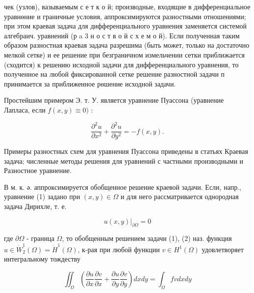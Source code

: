 \documentclass[10pt]{article}
\begin{document}
чек (узлов), вазываемым с е т к о й; производные, входящие в дифференциальное уравнөние и граничные условия, аппроксимируются разностными отношениями; при этом краевая задача для дифференциального уравнения заменяется системой алгебраич. уравнений (р a 3 н о с т в о й с х е м о й). Если полученная таким образом разностная краевая задача разрешима (быть может, только на достаточно мелкой сетке) и ее решение при безграничном измельчении сетки приближается (сходится) к решению исходной задачи для дифференциального уравнения, то полученное на любой фиксированной сетке решение разностной задачи п принимается за приближенное рөшение исходной задачи.



Простейшим примером Э. т. У. является уравнение Пуассона (уравнение Лапласа, если $f(x, y) \equiv 0)$ :



\[

\frac{\partial^{2} u}{\partial x^{2}}+\frac{\partial^{2} u}{\partial y^{2}}=-f(x, y) .

\]



Примеры разностных схем для уравнения Пуассона приведены в статьях Краевая задача; численные методы решения для уравнений с частными производными и Разностное уравнение.



В м. к. ә. аппроксимируется обобщенное решение краевой задачи. Если, напр., уравнение (1) задано при $(x, y) \in \Omega$ и для него рассматривается однородная задача Дирихле, т. е.



\[

\left.u(x, y)\right|_{\partial \Omega}=0

\]



где $\partial \Omega$ - граница $\Omega$, то обобщенным решением задачи (1), (2) наз. функция $u \in \dot{W}_{2}^{1}(\Omega)=\dot{H}^{1}(\Omega)$, к-рая при любой функции $v \in H^{1}(\Omega)$ удовлетворяет интегральному тождеству



\[

\iint_{\Omega}\left(\frac{\partial u}{\partial x} \frac{\partial v}{\partial x}+\frac{\partial u}{\partial y} \frac{\partial v}{\partial y}\right) d x d y=\int_{\Omega} f v d x d y

\]
\end{document}
